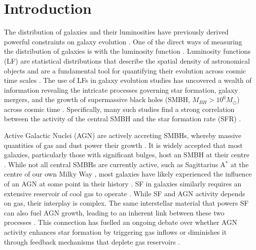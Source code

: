 \section{Introduction}

The distribution of galaxies and their luminosities have previously derived powerful constraints on galaxy evolution \citep{binggeli_luminosity_1988, benson_what_2003, rodighiero_mid-_2010, gruppioni_herschel_2013}. One of the direct ways of measuring the distribution of galaxies is with the luminosity function \citep{schechter_analytic_1976, saunders_60-mum_1990}. Luminosity functions (LF) are statistical distributions that describe the spatial density of astronomical objects and are a fundamental tool for quantifying their evolution across cosmic time scales \citep{dai_mid-infrared_2009, han_evolution_2012, wylezalek_galaxy_2014}. The use of LFs in galaxy evolution studies has uncovered a wealth of information revealing the intricate processes governing star formation, galaxy mergers, and the growth of supermassive black holes (SMBH, $M_{BH} > 10^{6} M_{\odot}$) across cosmic time \citep{caputi_infrared_2007, hopkins_observational_2007, rodighiero_mid-_2010, gruppioni_modelling_2011, gruppioni_herschel_2013, magnelli_deepest_2013, delvecchio_tracing_2014, hernan-caballero_resolving_2015, symeonidis_agn_2021, thorne_deep_2022}. Specifically, many such studies find a strong correlation between the activity of the central SMBH and the star formation rate (SFR) \citep{hopkins_cosmological_2008, merloni_synthesis_2008}. 

Active Galactic Nuclei (AGN) are actively accreting SMBHs, whereby massive quantities of gas and dust power their growth \citep{hopkins_cosmological_2008, han_evolution_2012, toba_9_2013, brown_infrared_2019}. It is widely accepted that most galaxies, particularly those with significant bulges, host an SMBH at their centre \citep{gruppioni_modelling_2011, han_evolution_2012, brown_infrared_2019}. While not all central SMBHs are currently active, such as Sagittarius A$^{*}$ at the centre of our own Milky Way \citep{event_horizon_telescope_collaboration_first_2022}, most galaxies have likely experienced the influence of an AGN at some point in their history \citep{gruppioni_modelling_2011}. SF in galaxies similarly requires an extensive reservoir of cool gas to operate \citep{schawinski_observational_2007, cicone_massive_2014}. While SF and AGN activity depends on gas, their interplay is complex. The same interstellar material that powers SF can also fuel AGN growth, leading to an inherent link between these two processes \citep{hopkins_cosmological_2008, brown_infrared_2019}. This connection has fuelled an ongoing debate over whether AGN activity enhances star formation by triggering gas inflows or diminishes it through feedback mechanisms that deplete gas reservoirs \citep{fiore_agn_2017, grazian_galaxy_2015}.


